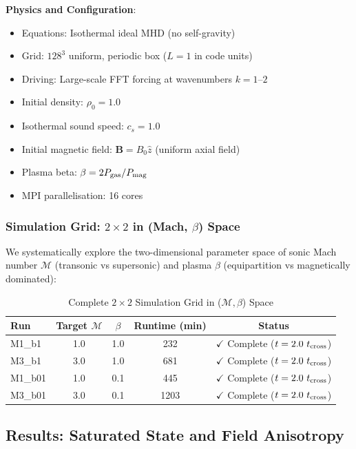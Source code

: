 \documentclass[11pt,a4paper]{article}
\begin{document}
\textbf{Physics and Configuration}:
\begin{itemize}
    \item Equations: Isothermal ideal MHD (no self-gravity)
    \item Grid: $128^3$ uniform, periodic box ($L = 1$ in code units)
    \item Driving: Large-scale FFT forcing at wavenumbers $k = 1$--$2$
    \item Initial density: $\rho_0 = 1.0$
    \item Isothermal sound speed: $c_s = 1.0$
    \item Initial magnetic field: $\mathbf{B} = B_0 \hat{z}$ (uniform axial field)
    \item Plasma beta: $\beta = 2P_{\rm gas}/P_{\rm mag}$
    \item MPI parallelisation: 16 cores
\end{itemize}

\subsubsection{Simulation Grid: $2\times2$ in (Mach, $\beta$) Space}

We systematically explore the two-dimensional parameter space of sonic Mach number $\mathcal{M}$ (transonic vs supersonic) and plasma $\beta$ (equipartition vs magnetically dominated):

\begin{table}[H]
\centering
\caption{Complete $2\times2$ Simulation Grid in ($\mathcal{M}, \beta$) Space}
\begin{tabular}{lcccc}
\toprule
Run & Target $\mathcal{M}$ & $\beta$ & Runtime (min) & Status \\
\midrule
M1\_b1  & 1.0 & 1.0 & 232  & $\checkmark$ Complete ($t = 2.0~t_{\rm cross}$) \\
M3\_b1  & 3.0 & 1.0 & 681  & $\checkmark$ Complete ($t = 2.0~t_{\rm cross}$) \\
M1\_b01 & 1.0 & 0.1 & 445  & $\checkmark$ Complete ($t = 2.0~t_{\rm cross}$) \\
M3\_b01 & 3.0 & 0.1 & 1203 & $\checkmark$ Complete ($t = 2.0~t_{\rm cross}$) \\
\bottomrule
\end{tabular}
\end{table}

\subsection{Results: Saturated State and Field Anisotropy}
\end{document}
